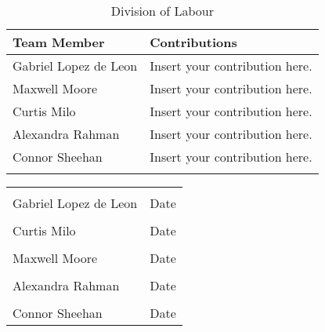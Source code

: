 \documentclass[]{article}
\begin{document}
\begin{longtable}{| p{} | p{} |}
			\hline
			\textbf {Team Member} & \textbf{Contributions}\\ 
			\hline
			Gabriel Lopez de Leon & Insert your contribution here.
			\\
			\hline
			Maxwell Moore & Insert your contribution here.
			\\
			\hline
			Curtis Milo & Insert your contribution here.
			\\ 
			\hline
			Alexandra Rahman & Insert your contribution here.
			\\
			\hline
			Connor Sheehan & Insert your contribution here.
			\\
			\hline
			
			\caption{Division of Labour}
	\end{longtable}



\noindent\begin{tabular}{ll}\\
	\makebox[2.5in]{\hrulefill} & \makebox[2.5in]			{\hrulefill}\\
	Gabriel Lopez de Leon & Date\\[8ex]%
	\makebox[2.5in]{\hrulefill} & \makebox[2.5in]			{\hrulefill}\\
	Curtis Milo & Date\\[8ex]
	\makebox[2.5in]{\hrulefill} & \makebox[2.5in]			{\hrulefill}\\
	Maxwell Moore & Date\\[8ex]
	\makebox[2.5in]{\hrulefill} & \makebox[2.5in]			{\hrulefill}\\
	Alexandra Rahman & Date\\[8ex]
	\makebox[2.5in]{\hrulefill} & \makebox[2.5in]			{\hrulefill}\\
	Connor Sheehan & Date\\
		\end{tabular}




\newpage
\end{document}
